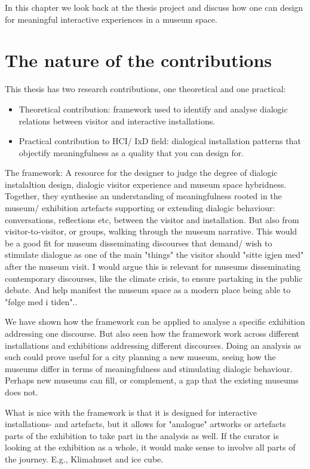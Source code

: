 In this chapter we look back at the thesis project and discuss how one can design for meaningful interactive experiences in a museum space.

\section{The nature of the contributions}
This thesis has two research contributions, one theoretical and one practical:
\begin{itemize}
    \item Theoretical contribution: framework used to identify and analyse dialogic relations between visitor and interactive installations.
    \item Practical contribution to HCI/ IxD field: dialogical installation patterns that objectify meaningfulness as a quality that you can design for.
\end{itemize}


The framework: A resource for the designer to judge the degree of dialogic instalaltion design, dialogic visitor experience and museum space hybridness. Together, they synthesise an understanding of meaningfulness rooted in the museum/ exhibition artefacts supporting or extending dialogic behaviour: conversations, reflections etc, between the visitor and installation. But also from visitor-to-visitor, or groups, walking through the museum narrative. This would be a good fit for museum disseminating discourses that demand/ wish to stimulate dialogue as one of the main "things" the visitor should "sitte igjen med" after the museum visit. I would argue this is relevant for museums disseminating contemporary discourses, like the climate crisis, to ensure partaking in the public debate. And help manifest the museum space as a modern place being able to "følge med i tiden".. 

We have shown how the framework can be applied to analyse a specific exhibition addressing one discourse. But also seen how the framework work across different installations and exhibitions addressing different discourses. Doing an analysis as such could prove useful for a city planning a new museum, seeing how the museums differ in terms of meaningfulness and stimulating dialogic behaviour. Perhaps new museums can fill, or complement, a gap that the existing museums does not. 

What is nice with the framework is that it is designed for interactive installations- and artefacts, but it allows for "analogue" artworks or artefacts parts of the exhibition to take part in the analysis as well. If the curator is looking at the exhibition as a whole, it would make sense to involve all parts of the journey. E.g., Klimahuset and ice cube. 

